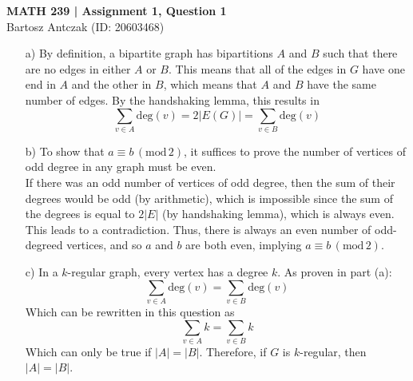 \documentclass{report}
\begin{document}
\noindent \textbf{MATH 239 | Assignment 1, Question 1}\\
Bartosz Antczak (ID: 20603468)
\onehalfspacing
\begin{enumerate}
\item[a)] By definition, a bipartite graph has bipartitions $A$ and $B$ such that there are no edges in either $A$ or $B$.
This means that all of the edges in $G$ have one end in $A$ and the other in $B$, which means that $A$ and $B$ have the same number of edges. By the handshaking lemma, this results in
$$\sum_{v \in A} \mathrm{deg}(v) = 2 \vert E(G) \vert = \sum_{v \in B} \mathrm{deg}(v)$$
\item[b)] To show that $a \equiv b\,(\mathrm{mod}\,2)$, it suffices to prove the number of vertices of odd degree in any graph must be even.\\
If there was an odd number of vertices of odd degree, then the sum of their degrees would be odd (by arithmetic), which is impossible since the sum of the degrees is equal to $2 \vert E \vert$ (by handshaking lemma), which is always even. This leads to a contradiction. Thus, there is always an even number of odd-degreed vertices, and so $a$ and $b$ are both even, implying $a \equiv b\,(\mathrm{mod}\,2)$.
\item[c)] In a $k$-regular graph, every vertex has a degree $k$. As proven in part (a):
$$\sum_{v \in A} \mathrm{deg}(v) = \sum_{v \in B} \mathrm{deg}(v)$$
Which can be rewritten in this question as
$$\sum_{v \in A} k = \sum_{v \in B} k$$
Which can only be true if $\vert A \vert = \vert B \vert$. Therefore, if $G$ is $k$-regular, then $\vert A \vert = \vert B \vert$.
\end{enumerate}
\end{document}
